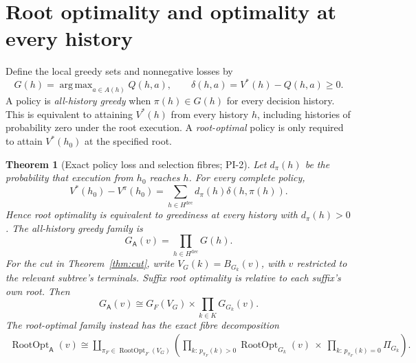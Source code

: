 \documentclass[11pt]{article}
\newtheorem{theorem}{Theorem}[section]
\theoremstyle{definition}
\DeclareMathOperator*{\argmax}{arg\,max}
\newcommand{\A}{\mathsf A}
\newcommand{\RootOpt}{\operatorname{RootOpt}}
\begin{document}
\section{Root optimality and optimality at every history}
\label{sec:selection}
Define the local greedy sets and nonnegative losses by
\[
 G(h)=\argmax_{a\in A(h)}Q(h,a),\qquad
 \delta(h,a)=V^*(h)-Q(h,a)\geq0.
\]
A policy is \emph{all-history greedy} when \(\pi(h)\in G(h)\) for every
decision history. This is equivalent to attaining \(V^*(h)\) from every
history \(h\), including histories of probability zero under the root
execution. A \emph{root-optimal} policy is only required to attain
\(V^*(h_0)\) at the specified root.

\begin{theorem}[Exact policy loss and selection fibres; PI-2]
\label{thm:loss}
Let \(d_\pi(h)\) be the probability that execution from \(h_0\) reaches
\(h\). For every complete policy,
\begin{equation}
 V^*(h_0)-V^\pi(h_0)
   =\sum_{h\in H^{\mathrm{dec}}}d_\pi(h)\delta(h,\pi(h)).
 \label{eq:loss}
\end{equation}
Hence root optimality is equivalent to greediness at every history with
\(d_\pi(h)>0\). The all-history greedy family is
\[
 G_\A(v)=\prod_{h\in H^{\mathrm{dec}}}G(h).
\]
For the cut in Theorem~\ref{thm:cut}, write \(V_G(k)=B_{G_k}(v)\),
with \(v\) restricted to the relevant subtree's terminals.
Suffix root optimality is relative to each suffix's own root.
Then
\begin{equation}
 G_\A(v)\cong G_F(V_G)\times\prod_{k\in K}G_{G_k}(v).
 \label{eq:greedycut}
\end{equation}
The root-optimal family instead has the exact fibre decomposition
\begin{equation}
\begin{split}
 \RootOpt_\A(v)\cong
 \coprod_{\pi_F\in\RootOpt_F(V_G)}
 \left(
 \prod_{k:\,p_{\pi_F}(k)>0}\RootOpt_{G_k}(v)
 \ \times\
 \prod_{k:\,p_{\pi_F}(k)=0}\Pi_{G_k}
 \right).
\end{split}
\label{eq:rootfibre}
\end{equation}
\end{theorem}
\end{document}
